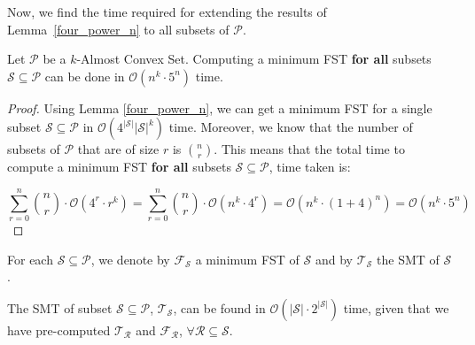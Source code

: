 Now, we find the time required for extending the results of Lemma~\ref{four_power_n} to all subsets of $\mathcal{P}$.
\begin{lemma}
\label{five_power_n}
Let $\mathcal P$ be a $k$-Almost Convex Set. Computing a minimum FST \textbf{for all} subsets $\mathcal S \subseteq \mathcal P$ can be done in $\mathcal O(n^k \cdot 5^{n})$ time.
\end{lemma}
\begin{proof}

Using Lemma \ref{four_power_n}, we can get a minimum FST for a single subset $\mathcal S \subseteq \mathcal P$ in $\mathcal O(4^{|{\mathcal S}|} |\mathcal S| ^ k)$ time. Moreover, we know that the number of subsets of $\mathcal P$ that are of size $r$ is $\binom n r$. This means that the total time to compute a minimum FST \textbf{for all} subsets $\mathcal S \subseteq \mathcal P$, time taken is: 


$$\sum \limits_{r = 0} ^ {n} \binom{n}{r} \cdot \mathcal O(4^r \cdot r^k) = \sum \limits_{r = 0} ^ {n} \binom{n}{r} \cdot \mathcal O(n^k \cdot 4^r) = \mathcal O(n^k \cdot (1 + 4)^n) = \mathcal O(n^k \cdot 5^n)$$

\end{proof}

For each $\mathcal S \subseteq \mathcal P$, we denote by $\mathcal F_{\mathcal S} $ a minimum FST of $\mathcal S$ and by $\mathcal T_{\mathcal S} $ the SMT of $\mathcal S$.

\begin{lemma}
\label{single_subset_SMT}
The SMT of subset $\mathcal S \subseteq \mathcal P$, $\mathcal T_{\mathcal S}$, can be found in $\mathcal O(|{\mathcal S}| \cdot 2^{|{\mathcal S}|})$ time, given that we have pre-computed $\mathcal T_{\mathcal R}$ and $\mathcal F_{\mathcal R}$, $\forall \mathcal R \subseteq \mathcal S$.
\end{lemma}

